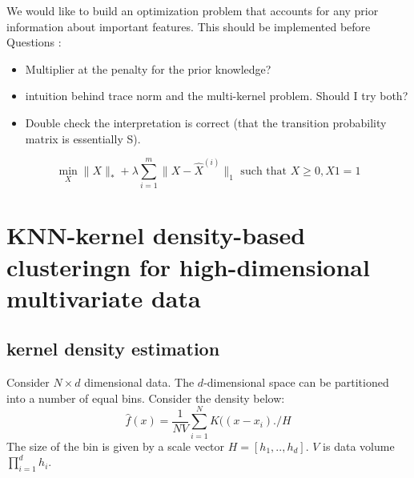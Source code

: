 \documentclass[11pt]{article}
\begin{document}
\noindent We would like to build an optimization problem that accounts for any prior information about important features. This should be implemented before \\

\noindent 
Questions : 
\begin{itemize}
\item
Multiplier at the penalty for the prior knowledge?
\item
intuition behind trace norm and the multi-kernel problem. Should I try both?
\item
Double check the interpretation is correct (that the transition probability matrix is essentially S). 

\end{itemize}



$$\min_X \|X \|_* + \lambda \sum_{i=1}^{m} \|X - \hat{X}^{(i)}\|_1 \text{ such that } X \geq 0, X1 = 1$$



\section{KNN-kernel density-based clusteringn for high-dimensional multivariate data}

\subsection*{kernel density estimation}
Consider $N \times d$ dimensional data. The $d$-dimensional space can be partitioned into a number of equal bins. Consider the density below:
$$\hat{f}(x) = \frac{1}{NV} \sum_{i=1}^{N} K((x-x_i)./H$$
The size of the bin is given by a scale vector $H=[h_1, .., h_d]$. $V$ is data volume $\prod_{i=1}^d h_i$. 





\end{document}
